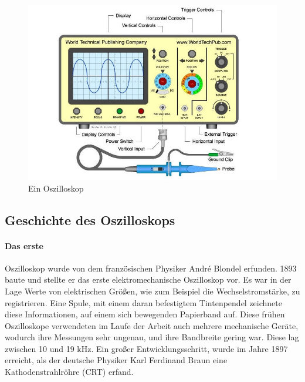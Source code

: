 \documentclass{article}
\begin{document}
\begin{figure}[H]
   \includegraphics[width=\textwidth]{"What-is-Oscilloscope"}
   \caption[\textbf{What-is-Oscilloscope.jpg},  Quelle:https://instrumentationtools.com/what-is-cathode-ray-oscilloscope/ (zuletzt abgerufen: 04.09.2021)]{Ein Oszilloskop}
\end{figure}
\newline

\subsection{Geschichte des Oszilloskops}
\paragraph{Das erste}
Oszilloskop wurde von dem französischen Physiker André Blondel erfunden. 1893 baute und stellte er das erste elektromechanische Oszilloskop vor. Es war in der Lage Werte von elektrischen Größen, wie zum Beispiel die Wechselstromstärke, zu registrieren. Eine Spule, mit einem daran befestigtem Tintenpendel zeichnete diese Informationen, auf einem sich bewegenden Papierband auf. Diese frühen Oszilloskope verwendeten im Laufe der Arbeit auch mehrere mechanische Geräte, wodurch ihre Messungen sehr ungenau, und ihre Bandbreite gering war. Diese lag zwischen 10 und 19 kHz. Ein großer Entwicklungsschritt, wurde im Jahre 1897 erreicht, als der deutsche Physiker Karl Ferdinand Braun eine Kathodenstrahlröhre (CRT) erfand.\cite{history}
\end{document}
